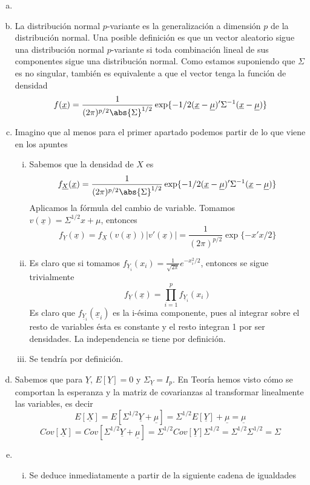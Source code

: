 \documentclass[twoside]{article}
\newcommand{\muestra}[1]{{\underline{#1}}}
\newcommand{\m}[1]{{\muestra{#1}}}
\begin{document}
\begin{solucion}
\begin{enumerate}[(a)]
\item[]
\item La distribución normal $p$-variante es la generalización a dimensión $p$ de la distribución normal. Una posible definición es que un vector aleatorio sigue una distribución normal $p$-variante si toda combinación lineal de sus componentes sigue una distribución normal. Como estamos suponiendo que $\Sigma$ es no singular, también es equivalente a que el vector tenga la función de densidad
$$
f(\muestra{x})=\frac{1}{(2\pi)^{p/2}\abs{\Sigma}^{1/2}}\exp\{-1/2(\muestra{x}-\muestra{\mu})'\Sigma^{-1}(\muestra{x}-\muestra{\mu})\}
$$
\item Imagino que al menos para el primer apartado podemos partir de lo que viene en los apuntes
\begin{enumerate}[i.]
\item Sabemos que la densidad de $X$ es
$$
f_\muestra{X}(\muestra{x})=\frac{1}{(2\pi)^{p/2}\abs{\Sigma}^{1/2}}\exp\{-1/2(\muestra{x}-\muestra{\mu})'\Sigma^{-1}(\muestra{x}-\muestra{\mu})\}
$$
Aplicamos la fórmula del cambio de variable. Tomamos $v(\muestra{x})=\Sigma^{1/2}x+\mu$, entonces
$$f_\muestra{Y}(\muestra{x})=f_\muestra{X}(v(\muestra{x}))|v'(\muestra{x})| = \frac{1}{(2\pi)^{p/2}}\exp\{-x'x/2\}
$$
\item Es claro que si tomamos $f_{\muestra{Y}_i}({x}_i)= \frac{1}{\sqrt{2\pi}}e^{-x_i^2/2}$, entonces se sigue trivialmente
$$
f_\muestra{Y}(\muestra{x})=\prod_{i=1}^p f_{\muestra{Y}_i}({x}_i)
$$
Es claro que $f_{\muestra{Y}_i}(\muestra{x}_i)$ es la i-ésima componente, pues al integrar sobre el resto de variables ésta es constante y el resto integran 1 por ser densidades. La independencia se tiene por definición.
\item Se tendría por definición.
\end{enumerate}
\item Sabemos que para $\muestra{Y}$, $E[\muestra{Y}]=0$ y $\Sigma_{\muestra{Y}}=I_p$. En Teoría hemos visto cómo se comportan la esperanza y la matriz de covarianzas al transformar linealmente las variables, es decir
$$
E[\muestra{X}]=E[\Sigma^{1/2}\muestra{Y}+\muestra{\mu}] = \Sigma^{1/2}E[\muestra{Y}]+\muestra{\mu}=\m{\mu}
$$
$$
Cov[\muestra{X}]=Cov[\Sigma^{1/2}\muestra{Y}+\muestra{\mu}] ={\Sigma^{1/2}}Cov[\m{Y}]\Sigma^{1/2}= {\Sigma^{1/2}}\Sigma^{1/2} =\Sigma
$$
\item 
\begin{enumerate}[i.]
\item Se deduce inmediatamente a partir de la siguiente cadena de igualdades

\end{enumerate}
\end{enumerate}
\end{solucion}
\end{document}
